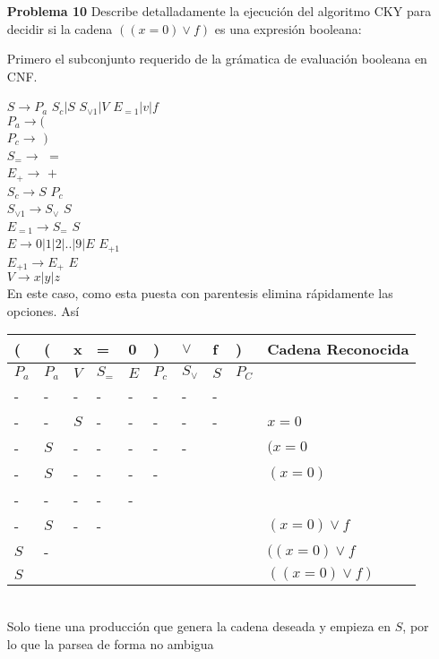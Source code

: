 \documentclass{article}
\begin{document}
\begin{enumerate}
\item[\bf{Problema 10}] Describe detalladamente la ejecución del algoritmo CKY para decidir si la cadena $((x = 0) \vee f)$ es una expresión booleana:


Primero el subconjunto requerido de la grámatica de evaluación booleana en CNF.

$S  \rightarrow  P_a$ $S_c | S$ $S_{\vee1} | V$ $E_{=1} |v|f$\\
$P_a \rightarrow ( $\\
$P_c \rightarrow$ $) $\\
$S_= \rightarrow$ $= $\\
$E_+ \rightarrow$ $+ $\\
$S_c \rightarrow  S$ $P_{c} $\\
$S_{\vee1} \rightarrow  S_{\vee}$ $S $\\
$E_{=1} \rightarrow  S_=$ $S $\\
$E \rightarrow 0|1|2|..|9|E$ $E_{+1} $\\
$E_{+1} \rightarrow E_+$ $E$\\
$V \rightarrow x|y|z $\\

En este caso, como esta puesta con parentesis elimina rápidamente las opciones.
Así

\begin{tabular}{ |l|l|l|l|l|l|l|l|l||l|}
  \hline
 ( & ( & x & = & 0 & ) & $\vee$ & f & ) & Cadena Reconocida \\
\hline  
$P_a$ & $P_a$ & $V$ & $S_=$ & $E$ & $P_c$ & $S_{\vee}$ & $S$ & $P_C$ &\\
 - & - & - & - & - & - & -  & - & &\\
 - & - & $S$ & - & - & - & -  & - & & $x=0$\\
 - & $S$ & - & - & - & - & - &  & & $(x=0$\\
 - & $S$  & - & - & - & - &  &  & & $(x=0)$\\
 - & -  & - & - & - &  &  &  & & \\
 - & $S$ & - & - &  &  &  &  & &  $(x=0) \vee f$ \\
 $S$ & - &  &  &  &  &  &  & &  $((x=0) \vee f$ \\
 $S$ &  &  &  &  &  &  &  & &  $((x=0) \vee f)$ \\
\hline  
\end{tabular}\\
Solo tiene una producción que genera la cadena deseada y empieza en $S$, por lo que la parsea de forma no ambigua

\end{enumerate}
\end{document}
